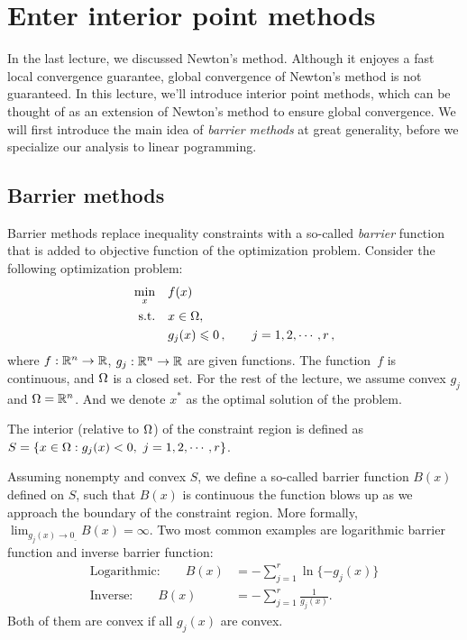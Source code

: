 \section{Enter interior point methods}
In the last lecture, we discussed Newton's method. Although it enjoyes a fast local
convergence guarantee, global convergence of Newton's method is not guaranteed. 
In this lecture, we'll introduce interior point methods, which can be thought of
as an extension of Newton's method to ensure global convergence.  We will first
introduce the main idea of \emph{barrier methods} at great generality, before we
specialize our analysis to linear pogramming.

\subsection{Barrier methods}
Barrier methods replace inequality constraints with a so-called \emph{barrier}
function that is added to objective function of the optimization problem. 
Consider the following optimization problem: 
\begin{align*}
\min_x  &\quad f(x)\\
\text{s.t.} &\quad x\in{\Omega},\\
&\quad g_j(x)\leqslant{0}\,,\qquad j=1,2,\cdots,r\,,
\end{align*}
where $f:\mathbb{R}^n\rightarrow\mathbb{R}$, $g_j:\mathbb{R}^n\rightarrow\mathbb{R}$ are given functions. 
The function~$f$ is continuous, and $\Omega$ is a closed set. For the rest of the lecture, we assume convex $g_j$ and $\Omega=\mathbb{R}^n$. And we denote $x^*$ as the optimal solution of the problem.

\begin{definition}
The interior (relative to $\Omega$) of the constraint region is defined as $S=\{x\in\domain:g_j(x)<0,\ j=1,2,\cdots,r\}$. 
\end{definition}

Assuming nonempty and convex $S$, we define a so-called barrier function $B(x)$
defined on $S$, such that $B(x)$ is continuous the function blows up as we
approach the boundary of the constraint region. More formally,
$\lim_{g_j(x)\rightarrow{0_{\_}}}B(x)=\infty$. Two most common examples are
logarithmic barrier function and inverse barrier function: 
\begin{align}
\text{Logarithmic:}\qquad B(x) &= -\sum_{j=1}^{r}\ln\{-g_j(x)\}\\
\text{Inverse:}\qquad B(x) &= -\sum_{j=1}^{r}\frac{1}{g_j(x)}.
\end{align}
Both of them are convex if all $g_j(x)$ are convex. 

